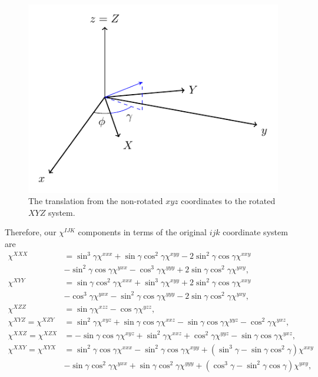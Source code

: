 \documentclass[aps,prb,10pt,letterpaper,notitlepage]{revtex4-1}
\begin{document}
\begin{figure}[b]
\centering
\includegraphics[width=0.5\linewidth]{axes}
\caption{The translation from the non-rotated $xyz$ coordinates to the rotated
$XYZ$ system.}
\label{fig:axes}
\end{figure}

Therefore, our $\chi^{IJK}$ components in terms of the original $ijk$ coordinate
system are
\begin{equation}\label{eq:xcomps}
\begin{split}
\chi^{XXX} 
&=  \sin^{3}\gamma          \chi^{xxx}
 +  \sin\gamma \cos^{2}\gamma \chi^{xyy}
 - 2\sin^{2}\gamma \cos\gamma \chi^{xxy}\\
&-  \sin^{2}\gamma \cos\gamma \chi^{yxx}
 -  \cos^{3}\gamma          \chi^{yyy}
 + 2\sin\gamma \cos^{2}\gamma \chi^{yxy},\\[10pt]
\chi^{XYY} 
&=  \sin\gamma \cos^{2}\gamma \chi^{xxx}
 +  \sin^{3}\gamma          \chi^{xyy}
 + 2\sin^{2}\gamma \cos\gamma \chi^{xxy}\\
&-  \cos^{3}\gamma          \chi^{yxx}
 -  \sin^{2}\gamma \cos\gamma \chi^{yyy}
 - 2\sin\gamma \cos^{2}\gamma \chi^{yxy},\\[10pt]
\chi^{XZZ} 
&= \sin\gamma \chi^{xzz}
 - \cos\gamma \chi^{yzz},\\[10pt]
\chi^{XYZ} = \chi^{XZY}
&=
   \sin^{2}\gamma      \chi^{xyz}
 + \sin\gamma \cos\gamma \chi^{xxz}
 - \sin\gamma \cos\gamma \chi^{yyz}
 - \cos^{2}\gamma      \chi^{yxz},\\[10pt]
\chi^{XXZ} = \chi^{XZX}
&=
 - \sin\gamma \cos\gamma \chi^{xyz}
 + \sin^{2}\gamma      \chi^{xxz}
 + \cos^{2}\gamma      \chi^{yyz}
 - \sin\gamma \cos\gamma \chi^{yxz},\\[10pt]
\chi^{XXY} = \chi^{XYX} 
&= 
   \sin^{2}\gamma \cos\gamma \chi^{xxx}
 - \sin^{2}\gamma \cos\gamma \chi^{xyy}
 + (\sin^{3}\gamma - \sin\gamma \cos^{2}\gamma) \chi^{xxy}\\
&- \sin\gamma \cos^{2}\gamma \chi^{yxx}
 + \sin\gamma \cos^{2}\gamma \chi^{yyy}
 + (\cos^{3}\gamma - \sin^{2}\gamma \cos\gamma) \chi^{yxy},
\end{split}
\end{equation}
\end{document}
